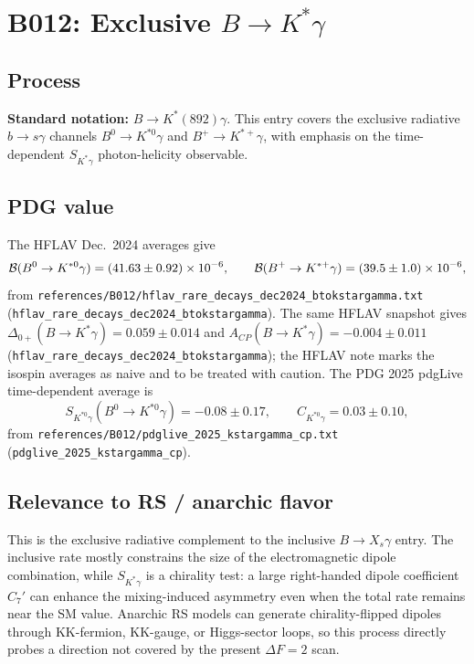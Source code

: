 
\section{B012: Exclusive \(B\to K^*\gamma\)}

\subsection*{Process}
\textbf{Standard notation:} \(B\to K^*(892)\gamma\).
This entry covers the exclusive radiative \(b\to s\gamma\) channels
\(B^0\to K^{*0}\gamma\) and \(B^+\to K^{*+}\gamma\), with emphasis on the
time-dependent \(S_{K^*\gamma}\) photon-helicity observable.

\subsection*{PDG value}
The HFLAV Dec.~2024 averages give
\[
{\cal B}(B^0\to K^{*0}\gamma)=(41.63\pm0.92)\times10^{-6},
\qquad
{\cal B}(B^+\to K^{*+}\gamma)=(39.5\pm1.0)\times10^{-6},
\]
from \texttt{references/B012/hflav\_rare\_decays\_dec2024\_btokstargamma.txt}
(\texttt{hflav\_rare\_decays\_dec2024\_btokstargamma}).  The same HFLAV
snapshot gives
\(\Delta_{0+}(B\to K^*\gamma)=0.059\pm0.014\) and
\(A_{CP}(B\to K^*\gamma)=-0.004\pm0.011\)
(\texttt{hflav\_rare\_decays\_dec2024\_btokstargamma}); the HFLAV note marks
the isospin averages as naive and to be treated with caution.  The PDG 2025
pdgLive time-dependent average is
\[
S_{K^{*0}\gamma}(B^0\to K^{*0}\gamma)=-0.08\pm0.17,
\qquad
C_{K^{*0}\gamma}=0.03\pm0.10,
\]
from \texttt{references/B012/pdglive\_2025\_kstargamma\_cp.txt}
(\texttt{pdglive\_2025\_kstargamma\_cp}).

\subsection*{Relevance to RS / anarchic flavor}
This is the exclusive radiative complement to the inclusive \(B\to X_s\gamma\)
entry.  The inclusive rate mostly constrains the size of the electromagnetic
dipole combination, while \(S_{K^*\gamma}\) is a chirality test: a large
right-handed dipole coefficient \(C_7'\) can enhance the mixing-induced
asymmetry even when the total rate remains near the SM value.  Anarchic RS
models can generate chirality-flipped dipoles through KK-fermion, KK-gauge,
or Higgs-sector loops, so this process directly probes a direction not covered
by the present \(\Delta F=2\) scan.

